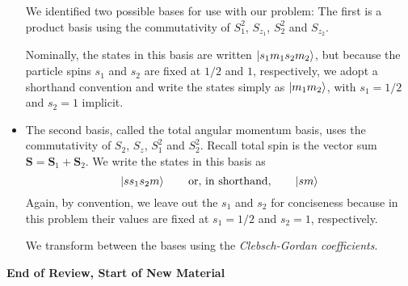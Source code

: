 \documentclass[11pt, a4paper]{article}
\newcommand{\eqtext}[1]{\qquad \text{#1} \qquad}
\renewcommand{\vec}[1]{\bm{#1}} %
\begin{document}
\begin{itemize}
	We identified two possible bases for use with our problem: The first is a product basis using the commutativity of $ S_{1}^{2} $, $ S_{z_{1}} $, $ S_{2}^{2} $ and $ S_{z_{2}} $. 
	
	Nominally, the states in this basis are written $ \ket{s_{1}m_{1}s_{2}m_{2}} $, but because the particle spins $ s_{1} $ and $ s_{2} $ are fixed at $ 1/2 $ and $ 1 $, respectively, we adopt a shorthand convention and write the states simply as $ \ket{m_{1}m_{2}} $, with $ s_{1} = 1/2 $ and $ s_{2} = 1 $ implicit.
	
	\item The second basis, called the total angular momentum basis, uses the commutativity of $ S_{2} $, $ S_{z} $, $ S_{1}^{2} $ and $ S_{2}^{2} $. Recall total spin is the vector sum $ \vec{S} = \vec{S}_{1} + \vec{S}_{2} $.  We write the states in this basis as
	\begin{equation*}
		\ket{ss_{1}s_{2}m} \eqtext{or, in shorthand,} \ket{sm}
	\end{equation*}
	Again, by convention, we leave out the $ s_{1} $ and $ s_{2} $ for conciseness because in this problem their values are fixed at $ s_{1} = 1/2 $ and $ s_{2} = 1 $, respectively.
	
	We transform between the bases using the \textit{Clebsch-Gordan coefficients}.
\end{itemize}
\textbf{End of Review, Start of New Material}
\end{document}
